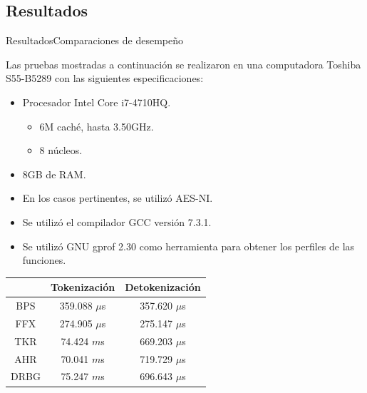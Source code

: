 %
%
%

\subsection{Resultados}

\begin{frame}{Resultados}{Comparaciones de desempeño}
  {
    Las pruebas mostradas a continuación se realizaron en una computadora
    Toshiba S55-B5289 con las siguientes especificaciones:
    \begin{itemize}
      \item Procesador Intel Core i7-4710HQ.
      \begin{itemize}
        \item 6M caché, hasta 3.50GHz.
        \item 8 núcleos.
      \end{itemize}
      \item 8GB de RAM.
      \item En los casos pertinentes, se utilizó AES-NI\footnotemark.
      \item Se utilizó el compilador GCC versión 7.3.1.
      \item Se utilizó GNU gprof 2.30 como herramienta para obtener los
        perfiles de las funciones.
    \end{itemize}
  }
  {
    {\small
      \begin{table}
        \begin{center}
          \begin{tabular}{c|c|c|}
            \cline{2-3}
            & Tokenización & Detokenización \\
            \hline
            \multicolumn{1}{|c|}{BPS}
              & 359.088   $\mu$s & 357.620 $\mu$s   \\\hline
            \multicolumn{1}{|c|}{FFX}
              & 274.905   $\mu$s & 275.147 $\mu$s   \\\hline

            \multicolumn{1}{|c|}{TKR}
              & 74.424  $m$s & 669.203 $\mu$s   \\\hline
            \multicolumn{1}{|c|}{AHR}
              & 70.041  $m$s & 719.729 $\mu$s   \\\hline
            \multicolumn{1}{|c|}{DRBG}
              & 75.247  $m$s & 696.643 $\mu$s  \\\hline
          \end{tabular}


\end{center}
\end{table}}}
\end{frame}
